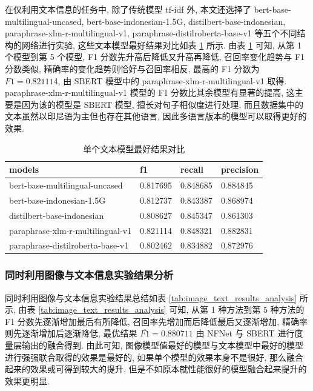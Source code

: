 \documentclass[12pt]{article}
\begin{document}
在仅利用文本信息的任务中, 除了传统模型 tf-idf 外, 本文还选择了 bert-base-multilingual-uncased, bert-base-indonesian-1.5G, distilbert-base-indonesian, paraphrase-xlm-r-multilingual-v1, paraphrase-distilroberta-base-v1 等五个不同结构的网络进行实验, 这些文本模型最好结果对比如表 \ref{tab:text_best_results_analysis} 所示. 由表 \ref{tab:text_best_results_analysis} 可知, 从第 1 个模型到第 5 个模型, F1 分数先升高后降低又升高再降低, 召回率变化趋势与 F1 分数类似, 精确率的变化趋势则恰好与召回率相反, 最高的 F1 分数为 $F1=0.821114$, 由 SBERT 模型中的 paraphrase-xlm-r-multilingual-v1 取得. paraphrase-xlm-r-multilingual-v1 模型的 F1 分数比其余模型有显著的提高, 这主要是因为该的模型是 SBERT 模型, 擅长对句子相似度进行处理, 而且数据集中的文本虽然以印尼语为主但也存在其他语言, 因此多语言版本的模型可以取得更好的效果.

\begin{table}[htbp]
  \centering
  \caption{单个文本模型最好结果对比}
  \label{tab:text_best_results_analysis}
  \begin{tabular}{llll}
    \toprule
    models           & f1       & recall   & precision \\
    \midrule
    bert-base-multilingual-uncased   & 0.817695 & 0.848685 & 0.884845  \\
    bert-base-indonesian-1.5G        & 0.812737 & 0.843387 & 0.868974  \\
    distilbert-base-indonesian       & 0.808627 & 0.845347 & 0.861303  \\
    paraphrase-xlm-r-multilingual-v1 & 0.821114 & 0.848321 & 0.882831  \\
    paraphrase-distilroberta-base-v1 & 0.802462 & 0.834882 & 0.872976 \\
    \bottomrule
  \end{tabular}
\end{table}

\subsubsection{同时利用图像与文本信息实验结果分析}

同时利用图像与文本信息实验结果总结如表 \ref{tab:image_text_results_analysis} 所示, 由表 \ref{tab:image_text_results_analysis} 可知, 从第 1 种方法到第 5 种方法的 F1 分数先逐渐增加最后有所降低, 召回率先增加而后降低最后又逐渐增加, 精确率则先逐渐增加后逐渐降低, 最优结果 $\overline{F1}=0.880711$ 由 NFNet 与 SBERT 进行度量层输出的融合得到. 由此可知, 图像模型值最好的模型与文本模型中最好的模型进行强强联合取得的效果是最好的, 如果单个模型的效果本身不是很好, 那么融合起来的效果或可得到较大的提升, 但是不如原本就性能很好的模型融合起来提升的效果更明显.
\end{document}
